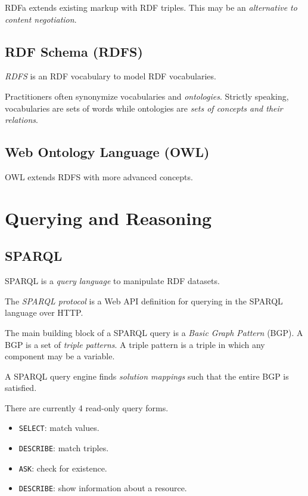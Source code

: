 \documentclass{report}
\begin{document}
RDFa extends existing markup with RDF triples.
This may be an \emph{alternative to content negotiation}.

\subsection{RDF Schema (RDFS)}

\emph{RDFS} is an RDF vocabulary
to model RDF vocabularies.

Practitioners often synonymize
vocabularies and \emph{ontologies}.
Strictly speaking, vocabularies are sets of words
while ontologies are \emph{sets of concepts and their relations}.

\subsection{Web Ontology Language (OWL)}

OWL extends RDFS with more advanced concepts.

\section{Querying and Reasoning}

\subsection{SPARQL}

SPARQL is a \emph{query language}
to manipulate RDF datasets.

The \emph{SPARQL protocol} is a Web API definition
for querying in the SPARQL language over HTTP.

The main building block of a SPARQL query is
a \emph{Basic Graph Pattern} (BGP).
A BGP is a set of \emph{triple patterns}.
A triple pattern is a triple
in which any component may be a variable.

A SPARQL query engine finds \emph{solution mappings}
such that the entire BGP is satisfied.

There are currently 4 read-only query forms.
\begin{itemize}
  \item \texttt{SELECT}: match values.
  \item \texttt{DESCRIBE}: match triples.
  \item \texttt{ASK}: check for existence.
  \item \texttt{DESCRIBE}: show information about a resource.
\end{itemize}
\end{document}
